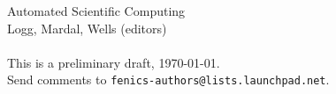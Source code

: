 \null\vfill
\noindent
\begin{minipage}{\textwidth}
  Automated Scientific Computing \\
  Logg, Mardal, Wells (editors) \\ \\
  This is a preliminary draft, \today. \\
  Send comments to \texttt{fenics-authors@lists.launchpad.net}.
\end{minipage}
\newpage

\pagestyle{fancy}
